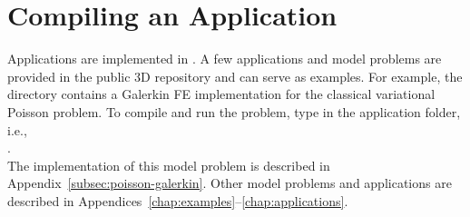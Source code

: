 \section{Compiling an Application}
\label{sec:application}

Applications are implemented in . A few applications and model problems are provided in the public \hp3D repository and can serve as examples. For example, the directory  contains a Galerkin FE implementation for the classical variational Poisson problem. To compile and run the problem, type  in the application folder, i.e.,\\
.\\
The implementation of this model problem is described in Appendix~\ref{subsec:poisson-galerkin}. Other model problems and applications are described in Appendices~\ref{chap:examples}--\ref{chap:applications}.

%


